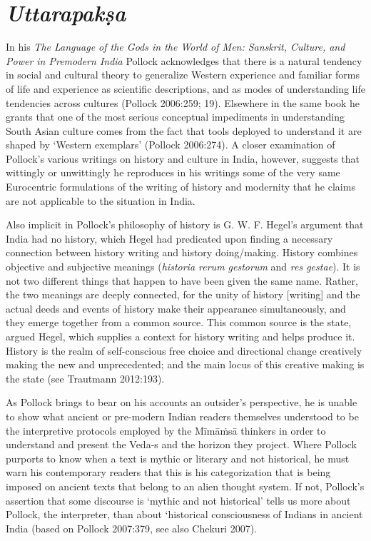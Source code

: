 \section*{\textit{Uttarapakṣa}}

In his \textit{The Language of the Gods in the World of Men: Sanskrit, Culture, and Power in Premodern India} Pollock acknowledges that there is a natural tendency in social and cultural theory to generalize Western experience and familiar forms of life and experience as scientific descriptions, and as modes of understanding life tendencies across cultures (Pollock 2006:259; 19). Elsewhere in the same book he grants that one of the most serious conceptual impediments in understanding South Asian culture comes from the fact that tools deployed to understand it are shaped by ‘Western exemplars’ (Pollock 2006:274). A closer examination of Pollock’s various writings on history and culture in India, however, suggests that wittingly or unwittingly he reproduces in his writings some of the very same Eurocentric formulations of the writing of history and modernity that he claims are not applicable to the situation in India.

Also implicit in Pollock’s philosophy of history is G. W. F. Hegel’s argument that India had no history, which Hegel had predicated upon finding a necessary connection between history writing and history doing/making. History combines objective and subjective meanings (\textit{historia rerum gestorum} and \textit{res gestae}). It is not two different things that happen to have been given the same name. Rather, the two meanings are deeply connected, for the unity of history [writing] and the actual deeds and events of history make their appearance simultaneously, and they emerge together from a common source. This common source is the state, argued Hegel, which supplies a context for history writing and helps produce it. History is the realm of self-conscious free choice and directional change creatively making the new and unprecedented; and the main locus of this creative making is the state (see Trautmann 2012:193).

As Pollock brings to bear on his accounts an outsider’s perspective, he is unable to show what ancient or pre-modern Indian readers themselves understood to be the interpretive protocols employed by the Mīmāṁsā thinkers in order to understand and present the \hbox{Veda-s} and the horizon they project. Where Pollock purports to know when a text is mythic or literary and not historical, he must warn his contemporary readers that this is his categorization that is being imposed on ancient texts that belong to an alien thought system. If not, Pollock’s assertion that some discourse is ‘mythic and not historical’ tells us more about Pollock, the interpreter, than about ‘historical consciousness of Indians in ancient India (based on Pollock 2007:379, see also Chekuri 2007).

